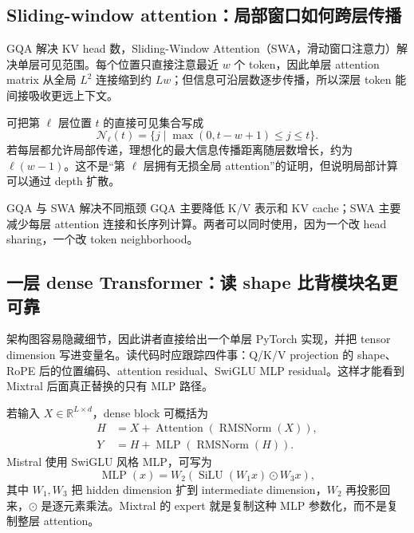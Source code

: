 
\subsection{Sliding-window attention：局部窗口如何跨层传播}

GQA 解决 KV head 数，Sliding-Window Attention（SWA，滑动窗口注意力）解决单层可见范围。每个位置只直接注意最近 $w$ 个 token，因此单层 attention matrix 从全局 $L^2$ 连接缩到约 $Lw$；但信息可沿层数逐步传播，所以深层 token 能间接吸收更远上下文。

可把第 $\ell$ 层位置 $t$ 的直接可见集合写成
\[
\mathcal{N}_{\ell}(t)=\{j\mid \max(0,t-w+1)\le j\le t\}.
\]
若每层都允许局部传递，理想化的最大信息传播距离随层数增长，约为 $\ell(w-1)$。这不是“第 $\ell$ 层拥有无损全局 attention”的证明，但说明局部计算可以通过 depth 扩散。

\begin{importantbox}{GQA 与 SWA 解决不同瓶颈}
GQA 主要降低 K/V 表示和 KV cache；SWA 主要减少每层 attention 连接和长序列计算。两者可以同时使用，因为一个改 head sharing，一个改 token neighborhood。
\end{importantbox}

\subsection{一层 dense Transformer：读 shape 比背模块名更可靠}

架构图容易隐藏细节，因此讲者直接给出一个单层 PyTorch 实现，并把 tensor dimension 写进变量名。读代码时应跟踪四件事：Q/K/V projection 的 shape、RoPE 后的位置编码、attention residual、SwiGLU MLP residual。这样才能看到 Mixtral 后面真正替换的只有 MLP 路径。


若输入 $X\in\mathbb{R}^{L\times d}$，dense block 可概括为
\begin{align*}
H &= X+\operatorname{Attention}(\operatorname{RMSNorm}(X)),\\
Y &= H+\operatorname{MLP}(\operatorname{RMSNorm}(H)).
\end{align*}
Mistral 使用 SwiGLU 风格 MLP，可写为
\[
\operatorname{MLP}(x)=W_2\left(\operatorname{SiLU}(W_1x)\odot W_3x\right),
\]
其中 $W_1,W_3$ 把 hidden dimension 扩到 intermediate dimension，$W_2$ 再投影回来，$\odot$ 是逐元素乘法。Mixtral 的 expert 就是复制这种 MLP 参数化，而不是复制整层 attention。

